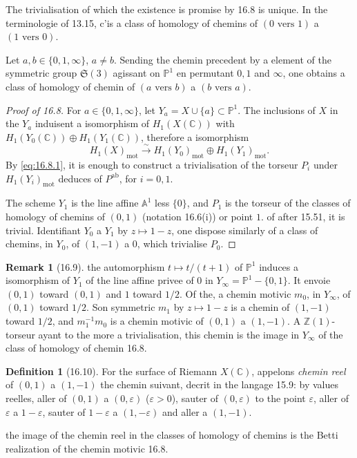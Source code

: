 \documentclass[12pt,a4paper]{article}
\theoremstyle{plain}
\theoremstyle{definition}
\newtheorem{definition}[theorem]{Definition}
\newtheorem{remark}[theorem]{Remark}
\theoremstyle{remark}
\newcommand{\bZ}{\mathbb{Z}}
\newcommand{\bC}{\mathbb{C}}
\newcommand{\bP}{\mathbb{P}}
\newcommand{\bA}{\mathbb{A}}
\newcommand{\mot}{\mathrm{mot}}
\begin{document}
The trivialisation of which the existence is promise by 16.8 is unique. In the terminologie of 13.15, c'is a class of homology of chemins of $(0 \text{ vers } 1)$ a $(1 \text{ vers } 0)$.

Let $a, b \in \{0, 1, \infty\}$, $a \neq b$. Sending the chemin precedent by a element of the symmetric group $\mathfrak{S}(3)$ agissant on $\bP^1$ en permutant $0, 1$ and $\infty$, one obtains a class of homology of chemin of $(a \text{ vers } b)$ a $(b \text{ vers } a)$.

\begin{proof}[Proof of 16.8]
For $a \in \{0, 1, \infty\}$, let $Y_a = X \cup \{a\} \subset \bP^1$. The inclusions of $X$ in the $Y_a$ induisent a isomorphism of $H_1(X(\bC))$ with $H_1(Y_0(\bC)) \oplus H_1(Y_1(\bC))$, therefore a isomorphism
\begin{equation}\label{eq:16.8.1}
H_1(X)_{\mot} \xrightarrow{\sim} H_1(Y_0)_{\mot} \oplus H_1(Y_1)_{\mot}.
\end{equation}
By \eqref{eq:16.8.1}, it is enough to construct a trivialisation of the torseur $P_i$ under $H_1(Y_i)_{\mot}$ deduces of $P^{\text{ab}}$, for $i = 0, 1$.

The scheme $Y_1$ is the line affine $\bA^1$ less $\{0\}$, and $P_1$ is the torseur of the classes of homology of chemins of $(0, 1)$ (notation 16.6(i)) or point $1$. of after 15.51, it is trivial. Identifiant $Y_0$ a $Y_1$ by $z \mapsto 1 - z$, one dispose similarly of a class of chemins, in $Y_0$, of $(1, -1)$ a $0$, which trivialise $P_0$.
\end{proof}

\begin{remark}[16.9]
the automorphism $t \mapsto t/(t+1)$ of $\bP^1$ induces a isomorphism of $Y_1$ of the line affine privee of $0$ in $Y_{\infty} = \bP^1 - \{0, 1\}$. It envoie $(0, 1)$ toward $(0, 1)$ and $1$ toward $1/2$. Of the, a chemin motivic $m_0$, in $Y_{\infty}$, of $(0, 1)$ toward $1/2$. Son symmetric $m_1$ by $z \mapsto 1 - z$ is a chemin of $(1, -1)$ toward $1/2$, and $m_1^{-1} m_0$ is a chemin motivic of $(0, 1)$ a $(1, -1)$. A $\bZ(1)$-torseur ayant to the more a trivialisation, this chemin is the image in $Y_{\infty}$ of the class of homology of chemin 16.8.
\end{remark}

\begin{definition}[16.10]
For the surface of Riemann $X(\bC)$, appelons \emph{chemin reel} of $(0, 1)$ a $(1, -1)$ the chemin suivant, decrit in the langage 15.9: by values reelles, aller of $(0, 1)$ a $(0, \varepsilon)$ ($\varepsilon > 0$), sauter of $(0, \varepsilon)$ to the point $\varepsilon$, aller of $\varepsilon$ a $1 - \varepsilon$, sauter of $1 - \varepsilon$ a $(1, -\varepsilon)$ and aller a $(1, -1)$.
\end{definition}

the image of the chemin reel in the classes of homology of chemins is the Betti realization of the chemin motivic 16.8.
\end{document}
